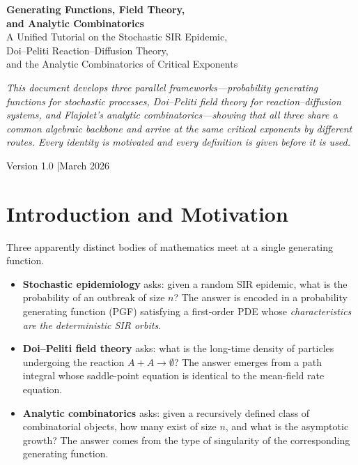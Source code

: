 \documentclass[11pt,a4paper]{article}
\theoremstyle{definition}
\begin{document}
\begin{titlepage}
\centering
\vspace*{2cm}
{\Huge\bfseries\color{deepblue} Generating Functions, Field Theory,\\[0.4em] and Analytic Combinatorics}\\[1em]
{\large\color{midblue} A Unified Tutorial on the Stochastic SIR Epidemic,\\
Doi--Peliti Reaction--Diffusion Theory,\\
and the Analytic Combinatorics of Critical Exponents}\\[3cm]

\begin{tcolorbox}[colback=lightblue,colframe=deepblue,width=0.85\textwidth]
\centering\itshape
This document develops three parallel frameworks---probability generating functions
for stochastic processes, Doi--Peliti field theory for reaction--diffusion systems,
and Flajolet's analytic combinatorics---showing that all three share a common
algebraic backbone and arrive at the same critical exponents by different routes.
Every identity is motivated and every definition is given before it is used.
\end{tcolorbox}

\vfill
{\small Version 1.0 \quad|\quad March 2026}
\end{titlepage}

\tableofcontents
\clearpage

\section{Introduction and Motivation}

Three apparently distinct bodies of mathematics meet at a single generating function.

\begin{itemize}[leftmargin=2em]
  \item \textbf{Stochastic epidemiology} asks: given a random SIR epidemic,
        what is the probability of an outbreak of size $n$? The answer is encoded
        in a probability generating function (PGF) satisfying a first-order PDE
        whose \emph{characteristics are the deterministic SIR orbits}.

  \item \textbf{Doi--Peliti field theory} asks: what is the long-time density
        of particles undergoing the reaction $A+A\to\emptyset$?
        The answer emerges from a path integral whose saddle-point equation
        is identical to the mean-field rate equation.

  \item \textbf{Analytic combinatorics} asks: given a recursively defined
        class of combinatorial objects, how many exist of size $n$, and what
        is the asymptotic growth? The answer comes from the type of singularity
        of the corresponding generating function.
\end{itemize}
\end{document}
